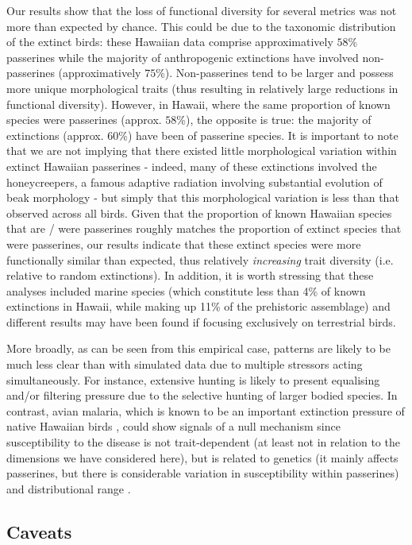 \documentclass[12pt,letterpaper]{article}
\begin{document}
Our results show that the loss of  functional diversity for several metrics was not more than expected by chance.
This could be due to the taxonomic distribution of the extinct birds: these Hawaiian data comprise approximatively $58$\% passerines while the majority of anthropogenic extinctions have involved non-passerines (approximatively $75$\%).
Non-passerines tend to be larger and possess more unique morphological traits (thus resulting in relatively large reductions in functional diversity).
However, in Hawaii, where the same proportion of known species were passerines (approx. $58$\%), the opposite is true: the majority of extinctions (approx. $60$\%) have been of passerine species.
It is important to note that we are not implying that there existed little morphological variation within extinct Hawaiian passerines - indeed, many of these extinctions involved the honeycreepers, a famous adaptive radiation involving substantial evolution of beak morphology \citep{Walther2022} - but simply that this morphological variation is less than that observed across all birds.
Given that the proportion of known Hawaiian species that are / were passerines roughly matches the proportion of extinct species that were passerines, our results indicate that these extinct species were more functionally similar than expected, thus relatively \textit{increasing} trait diversity (i.e. relative to random extinctions).
In addition, it is worth stressing that these analyses included marine species (which constitute less than 4\% of  known extinctions in Hawaii, while making up 11\% of the prehistoric assemblage) and different results may have been found if focusing exclusively on terrestrial birds.

More broadly, as can be seen from this empirical case, patterns are likely to be much less clear than with simulated data due to multiple stressors acting simultaneously.
For instance, extensive hunting is likely to present equalising and/or filtering pressure due to the selective hunting of larger bodied species.
In contrast, avian malaria, which is known to be an important extinction pressure of native Hawaiian birds \citep{samuel2011dynamics}, could show signals of a null mechanism since susceptibility to the disease is not trait-dependent (at least not in relation to the dimensions we have considered here), but is related to genetics (it mainly affects passerines, but there is considerable variation in susceptibility within passerines) and distributional range \citep{jessup2023wildlife}.

\subsection{Caveats}
\end{document}
